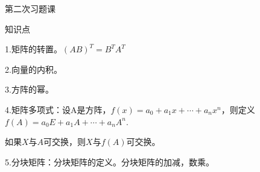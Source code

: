\documentclass{article}
\begin{document}
 \renewcommand{\thenum}{\arabic{num}.} \newcommand{\num}{\refstepcounter{num}\text{\thenum}}

\hphantom{~~}\hfill {\heiti 第二次习题课} \hfill\hphantom{~~}

\hphantom{~~}\hfill {\heiti 知识点} \hfill\hphantom{~~}

1.矩阵的转置。$(AB)^{T}=B^{T}A^{T}$

2.向量的内积。

3.方阵的幂。

4.矩阵多项式：设A是方阵，$f(x)=a_{0}+a_{1}x+\cdots+a_{n}x^{n}$，则定义$f(A)=a_{0}E+a_{1}A+\cdots+a_{n}A^{n}$.

如果$X$与$A$可交换，则$X$与$f(A)$可交换。

5.分块矩阵：分块矩阵的定义。分块矩阵的加减，数乘。
\end{document}
